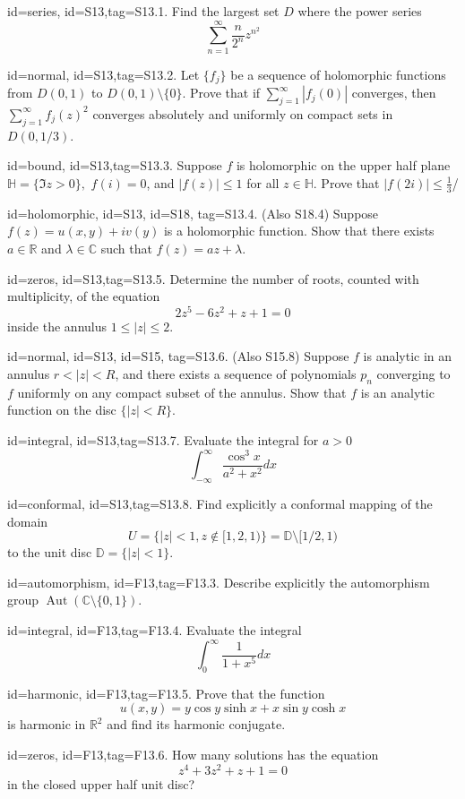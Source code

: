 \documentclass[12pt,letterpaper]{article}
\DeclareMathOperator{\Aut}{Aut}
\begin{document}
{%


\item[id=series, id=S13,tag=S13.1.]
Find the largest set $D$ where the power series
\[
	\sum_{n=1}^{\infty} \frac{n}{2^n} z^{n^2}
\]
\item[id=normal, id=S13,tag=S13.2.]
Let $\{f_j\}$ be a sequence of holomorphic functions from $D(0,1)$ to $D(0,1) \setminus \{0\}$. Prove that if $\sum_{j=1}^{\infty} | f_j(0) |$ converges, then $\sum_{j=1}^{\infty} f_j(z)^2$ converges absolutely and uniformly on compact sets in $D(0,1/3)$.

\item[id=bound, id=S13,tag=S13.3.]
Suppose $f$ is holomorphic on the upper half plane $\mathbb{H} = \{\Im z > 0\},$ $f(i) = 0$, and $| f(z) | \le 1$ for all $z \in \mathbb{H}$. Prove that $| f(2i) | \le \frac{1}{3}$/

\item[id=holomorphic, id=S13, id=S18, tag=S13.4.]
(Also S18.4) Suppose $f(z) = u(x,y) + iv(y)$ is a holomorphic function. Show that there exists $a \in \mathbb{R}$ and $\lambda \in \mathbb{C}$ such that $f(z) = az + \lambda$.

\item[id=zeros, id=S13,tag=S13.5.]
Determine the number of roots, counted with multiplicity, of the equation
\[
	2z^5 - 6z^2 + z + 1 =0
\]
inside the annulus $1 \le | z | \le 2$.

\item[id=normal, id=S13, id=S15, tag=S13.6.]
(Also S15.8) Suppose $f$ is analytic in an annulus $r < | z | < R$, and there exists a sequence of polynomials $p_n$ converging to $f$ uniformly on any compact subset of the annulus. Show that $f$ is an analytic function on the disc $\{| z | < R\}$.
\item[id=integral, id=S13,tag=S13.7.]
Evaluate the integral for $a > 0$
\[
	\int_{-\infty}^{\infty} \frac{\cos^3x}{a^2 + x^2} dx
\]
\item[id=conformal, id=S13,tag=S13.8.]
Find explicitly a conformal mapping of the domain
\[
	U = \{| z | < 1, z \notin [1,2,1) \} = \mathbb{D} \setminus [1/2,1)
\]
to the unit disc $\mathbb{D} = \{| z | < 1\}.$


\item[id=automorphism, id=F13,tag=F13.3.]
Describe explicitly the automorphism group $\Aut(\mathbb{C} \setminus \{0,1\})$.
\item[id=integral, id=F13,tag=F13.4.]
Evaluate the integral
\[
	\int_{0}^{\infty} \frac{1}{1+x^5} dx
\]
\item[id=harmonic, id=F13,tag=F13.5.]
Prove that the function
\[
	u(x,y) = y \cos y \sinh x + x \sin y \cosh x
\]
is harmonic in $\mathbb{R}^2$ and find its harmonic conjugate.
\item[id=zeros, id=F13,tag=F13.6.]
How many solutions has the equation
\[
	z^4 + 3z^2 + z + 1 = 0
\]
in the closed upper half unit disc?

}
\end{document}
